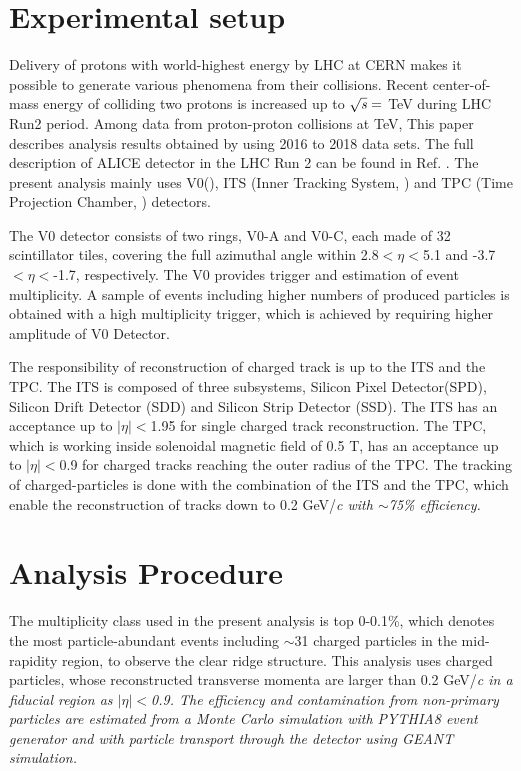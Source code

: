 
\section{Experimental setup}
\label{sec:experiment}

Delivery of protons with world-highest energy by LHC at CERN makes it possible to generate various phenomena from their collisions. Recent center-of-mass energy of colliding two protons is increased up to $\sqrt{\it{s}} =$ \unit[13]{TeV} during LHC Run2 period. Among data from proton-proton collisions at \unit[13]{TeV}, This paper describes analysis results obtained by using 2016 to 2018 data sets. The full description of ALICE detector in the LHC Run 2 can be found in Ref. \cite{ALICEdet}. The present analysis mainly uses V0(\cite{VZEROpaper}), ITS (Inner Tracking System, \cite{ITSpaper}) and TPC (Time Projection Chamber, \cite{TPCpaper}) detectors.

The V0 detector consists of two rings, V0-A and V0-C, each made of 32 scintillator tiles, covering the full azimuthal angle within 2.8$<\eta<$5.1 and -3.7$<\eta<$-1.7, respectively. The V0 provides trigger and estimation of event multiplicity. A sample of events including higher numbers of produced particles is obtained with a high multiplicity trigger, which is achieved by requiring higher amplitude of V0 Detector. 

The responsibility of reconstruction of charged track is up to the ITS and the TPC. The ITS is composed of three subsystems, Silicon Pixel Detector(SPD), Silicon Drift Detector (SDD) and Silicon Strip Detector (SSD). The ITS has an acceptance up to $|\eta|<$1.95 for single charged track reconstruction. The TPC, which is working inside solenoidal magnetic field of 0.5 T, has an acceptance up to $|\eta|<$0.9 for charged tracks reaching the outer radius of the TPC. The tracking of charged-particles is done with the combination of the ITS and the TPC, which enable the reconstruction of tracks down to 0.2 GeV/\it{c}\rm{} with $\sim$75\% efficiency.

\section{Analysis Procedure}
\label{sec:ana}

The multiplicity class used in the present analysis is top 0-0.1\%, which denotes the most particle-abundant events including  $\sim$31 charged particles in the mid-rapidity region, to observe the clear ridge structure. This analysis uses charged particles, whose reconstructed transverse momenta are larger than 0.2 GeV/\it{c}\rm{} in a fiducial region as $|\eta|<$0.9. The efficiency and contamination from non-primary particles are estimated from a Monte Carlo simulation with PYTHIA8 event generator and with particle transport through the detector using GEANT simulation.

